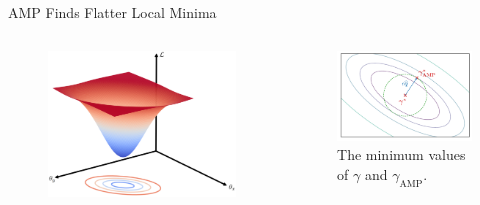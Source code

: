 \begin{frame}{AMP Finds Flatter Local Minima}
\begin{columns}
\begin{figure}
\includegraphics[width=.7\textwidth]{figs/surface.png}
\end{figure}
\vspace{-0.5em}
\begin{figure}
\includegraphics[width=.7\textwidth]{figs/gaussian.pdf}
\caption{The minimum values of $\gamma$ and $\gamma_\mathrm{AMP}$.}
\end{figure}
\end{columns}
\vspace{1em}
\end{frame}

